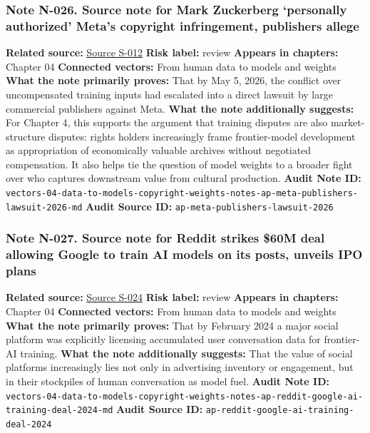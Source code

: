 \documentclass[
  american,
  11pt,
  letterpaper,
]{article}
\begin{document}
\subsubsection{Note N-026. Source note for Mark Zuckerberg `personally
authorized' Meta's copyright infringement, publishers
allege}\label{note-n-026-vectors-04-data-to-models-copyright-weights-notes-ap-meta-publishers-lawsuit-2026-md}

\textbf{Related source:}
\hyperref[source-s-012-mark-zuckerberg-personally-authorized-meta-s-copyright-infringement-publishers-allege]{Source
S-012} \textbf{Risk label:} review \textbf{Appears in chapters:} Chapter
04 \textbf{Connected vectors:} From human data to models and weights
\textbf{What the note primarily proves:} That by May 5, 2026, the
conflict over uncompensated training inputs had escalated into a direct
lawsuit by large commercial publishers against Meta. \textbf{What the
note additionally suggests:} For Chapter 4, this supports the argument
that training disputes are also market-structure disputes: rights
holders increasingly frame frontier-model development as appropriation
of economically valuable archives without negotiated compensation. It
also helps tie the question of model weights to a broader fight over who
captures downstream value from cultural production. \textbf{Audit Note
ID:}
\texttt{vectors-04-data-to-models-copyright-weights-notes-ap-meta-publishers-lawsuit-2026-md}
\textbf{Audit Source ID:} \texttt{ap-meta-publishers-lawsuit-2026}

\subsubsection{Note N-027. Source note for Reddit strikes \$60M deal
allowing Google to train AI models on its posts, unveils IPO
plans}\label{note-n-027-vectors-04-data-to-models-copyright-weights-notes-ap-reddit-google-ai-training-deal-2024-md}

\textbf{Related source:}
\hyperref[source-s-024-reddit-strikes-60m-deal-allowing-google-to-train-ai-models-on-its-posts-unveils-ipo-plans]{Source
S-024} \textbf{Risk label:} review \textbf{Appears in chapters:} Chapter
04 \textbf{Connected vectors:} From human data to models and weights
\textbf{What the note primarily proves:} That by February 2024 a major
social platform was explicitly licensing accumulated user conversation
data for frontier-AI training. \textbf{What the note additionally
suggests:} That the value of social platforms increasingly lies not only
in advertising inventory or engagement, but in their stockpiles of human
conversation as model fuel. \textbf{Audit Note ID:}
\texttt{vectors-04-data-to-models-copyright-weights-notes-ap-reddit-google-ai-training-deal-2024-md}
\textbf{Audit Source ID:}
\texttt{ap-reddit-google-ai-training-deal-2024}
\end{document}
